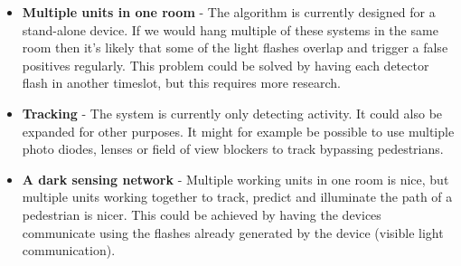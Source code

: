 \begin{itemize}
	\item \textbf{Multiple units in one room} - The algorithm is currently designed for a stand-alone device. If we would hang multiple of these systems in the same room then it's likely that some of the light flashes overlap and trigger a false positives regularly. This problem could be solved by having each detector flash in another timeslot, but this requires more research.
	\item \textbf{Tracking} - The system is currently only detecting activity. It could also be expanded for other purposes. It might for example be possible to use multiple photo diodes, lenses or field of view blockers to track bypassing pedestrians.
	\item \textbf{A dark sensing network} - Multiple working units in one room is nice, but multiple units working together to track, predict and illuminate the path of a pedestrian is nicer. This could be achieved by having the devices communicate using the flashes already generated by the device (visible light communication).
\end{itemize}